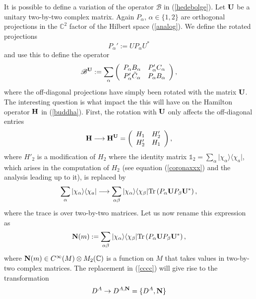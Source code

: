 \documentclass[letterpaper,11pt]{article}
\newcommand{\nn}{\nonumber}
\def\a{\alpha}
\def\b{\beta}
\begin{document}
It is possible to define a variation of the operator $\mathscr{B}$ in (\ref{hedebolge}).
Let ${\bf U}$ be a unitary two-by-two complex matrix. Again $P_\a$, $\a\in\{1,2\}$ are orthogonal projections in the $\mathbb{C}^2$ factor of the Hilbert space (\ref{analog}). We define the rotated projections 
$$
P_\a' := U P_\a U^*
$$
and use this to define the operator
\begin{eqnarray}
\mathscr{B}^{\bf U} :=  \sum_\a \left(
\begin{array}{cc}
 P_\a  B_\a  &     P_\a' C_\a \\ 
 P_\a' \tilde{C}_\a    &   P_\a  B_\a
\end{array}
\right),
\label{BDx222}
\end{eqnarray}
where the off-diagonal projections have simply been rotated with the matrix ${\bf U}$.
The interesting question is what impact the this will have on the Hamilton operator ${\bf H}$ in  (\ref{buddha}). First, the rotation with ${\bf U} $ only affects the off-diagonal entries 
\begin{eqnarray}
{\bf H}\longrightarrow {\bf H}^{\bf U}=
\left(
\begin{array}{cc}
H_{1}  &   H'_{2} \\
  H'_{2} &  {H}_{1} 
\end{array}
\right),
\nn
\end{eqnarray}
where $H'_{2}$ is a modification of $H_2$ where the identity matrix $\mathds{1}_2 = \sum_\a \vert \chi_\a \rangle \langle \chi_a\vert $, which arises in the computation of $H_2$ (see equation (\ref{coronaxxx}) and the analysis leading up to it), is replaced by
\begin{equation}
\sum_\a \vert \chi_\a \rangle \langle \chi_a \vert
\longrightarrow
    \sum_{\a\b} \vert \chi_\a \rangle \langle \chi_\b \vert \mbox{Tr}\left( P_\a  {\bf U} P_\b  {\bf U}^*   \right),
    \label{cccc}
\end{equation}
where the trace is over two-by-two matrices. Let us now rename this expression as
\begin{equation}
 {\bf N}(m):=    \sum_{\a\b} \vert \chi_\a \rangle \langle \chi_\b \vert \mbox{Tr}\left( P_\a {\bf U} P_\b  {\bf U}^* \right) ,
\end{equation}
where $ {\bf N}(m)\in C^\infty(M)\otimes M_2(\mathbb{C})$ is a function on $M$ that takes values in two-by-two complex matrices. The replacement in (\ref{cccc}) will give rise to the transformation
\begin{equation}
D^A\rightarrow D^{A,{\bf N}} = \{D^A, {\bf N}\}
\label{Maja}
\end{equation}
\end{document}
